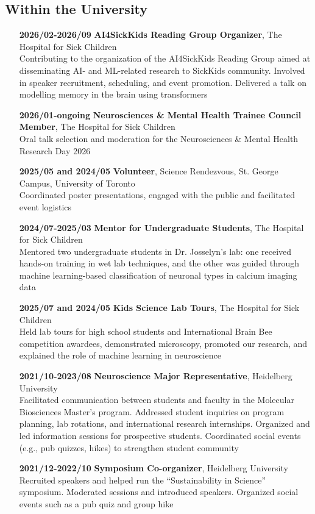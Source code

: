 \documentclass[12pt]{article}
\begin{document}
\subsection*{Within the University}
\begin{itemize}
    \item[\textbf{2026/02-2026/09}] \textbf{AI4SickKids Reading Group Organizer}, The Hospital for Sick Children \\ 
    Contributing to the organization of the AI4SickKids Reading Group aimed at disseminating AI- and ML-related research to SickKids community. Involved in speaker recruitment, scheduling, and event promotion. Delivered a talk on modelling memory in the brain using transformers
    \item[\textbf{2026/01-ongoing}] \textbf{Neurosciences \& Mental Health Trainee Council Member}, The Hospital for Sick Children \\ 
    Oral talk selection and moderation for the Neurosciences \& Mental Health Research Day 2026
    \item[\textbf{2025/05 and 2024/05}] \textbf{Volunteer}, Science Rendezvous, St. George Campus, University of Toronto \\  
    Coordinated poster presentations, engaged with the public and facilitated event logistics
    \item[\textbf{2024/07-2025/03}] \textbf{Mentor for Undergraduate Students}, The Hospital for Sick Children \\ 
    Mentored two undergraduate students in Dr. Josselyn's lab: one received hands-on training in wet lab techniques, and the other was guided through machine learning-based classification of neuronal types in calcium imaging data
    \item[\textbf{2025/07 and 2024/05}] \textbf{Kids Science Lab Tours}, The Hospital for Sick Children \\ 
    Held lab tours for high school students and International Brain Bee competition awardees, demonstrated microscopy, promoted our research, and explained the role of machine learning in neuroscience
    \item[\textbf{2021/10-2023/08}] \textbf{Neuroscience Major Representative}, Heidelberg University \\ 
    Facilitated communication between students and faculty in the Molecular Biosciences Master's program. Addressed student inquiries on program planning, lab rotations, and international research internships. Organized and led information sessions for prospective students. Coordinated social events (e.g., pub quizzes, hikes) to strengthen student community
    \item[\textbf{2021/12-2022/10}] \textbf{Symposium Co-organizer}, Heidelberg University \\ 
    Recruited speakers and helped run the “Sustainability in Science” symposium. Moderated sessions and introduced speakers. Organized social events such as a pub quiz and group hike
\end{itemize}
\end{document}
